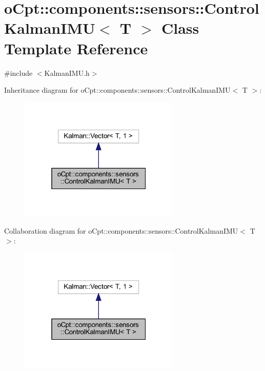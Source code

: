 \hypertarget{classo_cpt_1_1components_1_1sensors_1_1_control_kalman_i_m_u}{}\section{o\+Cpt\+:\+:components\+:\+:sensors\+:\+:Control\+Kalman\+I\+MU$<$ T $>$ Class Template Reference}
\label{classo_cpt_1_1components_1_1sensors_1_1_control_kalman_i_m_u}


{\ttfamily \#include $<$Kalman\+I\+M\+U.\+h$>$}



Inheritance diagram for o\+Cpt\+:\+:components\+:\+:sensors\+:\+:Control\+Kalman\+I\+MU$<$ T $>$\+:
\nopagebreak
\begin{figure}[H]
\begin{center}
\leavevmode
\includegraphics[width=217pt]{classo_cpt_1_1components_1_1sensors_1_1_control_kalman_i_m_u__inherit__graph}
\end{center}
\end{figure}


Collaboration diagram for o\+Cpt\+:\+:components\+:\+:sensors\+:\+:Control\+Kalman\+I\+MU$<$ T $>$\+:
\nopagebreak
\begin{figure}[H]
\begin{center}
\leavevmode
\includegraphics[width=217pt]{classo_cpt_1_1components_1_1sensors_1_1_control_kalman_i_m_u__coll__graph}
\end{center}
\end{figure}
